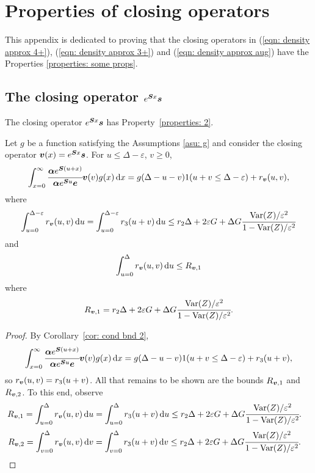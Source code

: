 \chapter{Properties of closing operators}\label{appendix: sec: 2}
This appendix is dedicated to proving that the closing operators in (\ref{eqn: density approx 4+}), (\ref{eqn: density approx 3+}) and (\ref{eqn: density approx aug}) have the Properties \ref{properties: some props}. 

\section{The closing operator \(e^{\boldsymbol S x}\boldsymbol s\)}
\begin{cor}\label{cor: cond bnd 2 V}
	The closing operator \(e^{\boldsymbol S x}\boldsymbol s\) has Property~\ref{properties: 2}.

	Let \(g\) be a function satisfying the Assumptions \ref{asu: g} and consider the closing operator \({\boldsymbol v}(x)=e^{\boldsymbol Sx}\boldsymbol s\). For \(u\leq \Delta-\varepsilon \), \(v\geq 0\), 
	\[\int_{x=0}^\infty \cfrac{\boldsymbol \alpha  e^{\boldsymbol{S} (u+x)} }{\boldsymbol \alpha  e^{\boldsymbol{S} u} \boldsymbol e} {\boldsymbol v}(v)g(x)\, \mathrm{d} x = g(\Delta-u-v) 1(u+v\leq\Delta-\varepsilon) + r_{\boldsymbol v} (u,v),\]
	where \[\displaystyle\int_{u=0}^{\Delta-\varepsilon}r_{\boldsymbol v}(u,v)\, \mathrm{d} u = \displaystyle\int_{u=0}^{\Delta-\varepsilon} r_3(u+v)\, \mathrm{d} u \leq r_2\Delta + 2\varepsilon G + \Delta G \cfrac{\mathrm{Var}(Z)/\varepsilon^2}{1-\mathrm{Var}(Z)/\varepsilon^2}\]
	and \[\int_{u=0}^\Delta r_{\boldsymbol v}(u,v) \, \mathrm{d} u\leq R_{{\boldsymbol v},1}\] where \[R_{{\boldsymbol v},1}=r_2\Delta + 2\varepsilon G + \Delta G \cfrac{\mathrm{Var}(Z)/\varepsilon^2}{1-\mathrm{Var}(Z)/\varepsilon^2}.\] 
\end{cor}
\begin{proof}
	By Corollary~\ref{cor: cond bnd 2}, 
	\[\int_{x=0}^\infty \cfrac{\boldsymbol \alpha  e^{\boldsymbol{S} (u+x)} }{\boldsymbol \alpha  e^{\boldsymbol{S} u} \boldsymbol e} {\boldsymbol v}(v)g(x)\, \mathrm{d} x = g(\Delta-u-v) 1(u+v\leq\Delta-\varepsilon) + r_3 (u+v),\]
	so \(r_{\boldsymbol v}(u,v)=r_3(u+v)\). All that remains to be shown are the bounds \(R_{{\boldsymbol v},1}\) and \(R_{{\boldsymbol v},2}\). To this end, observe 
	\begin{align*}
		R_{{\boldsymbol v},1}= \displaystyle\int_{u=0}^{\Delta}r_{\boldsymbol v}(u,v)\, \mathrm{d} u 
		 &= \displaystyle\int_{u=0}^{\Delta} r_3(u+v)\, \mathrm{d} u 
		 \leq r_2\Delta + 2\varepsilon G + \Delta G \cfrac{\mathrm{Var}(Z)/\varepsilon^2}{1-\mathrm{Var}(Z)/\varepsilon^2}.
	\end{align*}
	\begin{align*}
		 R_{{\boldsymbol v},2}= \displaystyle\int_{v=0}^{\Delta}r_{\boldsymbol v}(u,v)\, \mathrm{d} v 
		 &= \displaystyle\int_{v=0}^{\Delta} r_3(u+v)\, \mathrm{d} v 
		 \leq r_2\Delta + 2\varepsilon G + \Delta G \cfrac{\mathrm{Var}(Z)/\varepsilon^2}{1-\mathrm{Var}(Z)/\varepsilon^2}.
	\end{align*}
\end{proof}

